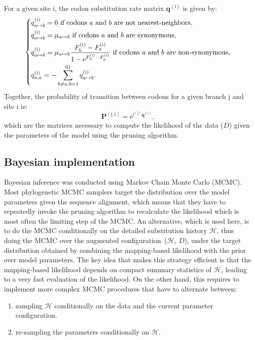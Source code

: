 \documentclass{article}
\newcommand{\BiDimArray}[1]{\bm{#1}}
\newcommand{\e}{\text{e}}
\newcommand{\submatrix}{q}
\newcommand{\Submatrix}{\BiDimArray{\submatrix}}
\newcommand{\probmatrix}{P}
\newcommand{\Probmatrix}{\BiDimArray{\probmatrix}}
\newcommand{\fit}{F}
\newcommand{\ci}{{a}}
\newcommand{\cj}{{b}}
\newcommand{\itoj}{\ci \mapsto \cj}
\newcommand{\fiti}{\fit_{\ci}}
\newcommand{\fitj}{\fit_{\cj}}
\newcommand{\branch}{\text{j}}
\newcommand{\branchexp}{^{(\branch)}}
\newcommand{\branchlength}{l}
\newcommand{\data}{D}
\newcommand{\site}{\text{i}}
\newcommand{\siteexp}{^{(\site)}}
\newcommand{\branchsiteexp}{^{(\branch, \site)}}
\newcommand{\subhistory}{\mathcal{H}}
\begin{document}
    For a given site $\site$, the {codon} {substitution} rate matrix $\Submatrix\siteexp$ is given by:
    \begin{equation}
        \label{eq:subrates}
        \begin{dcases}
            \submatrix\siteexp_{\itoj} = 0\text{ if codons $\ci$ and $\cj$ are not nearest-neighbors,} \\
            \submatrix\siteexp_{\itoj} = \mu_{\itoj}\text{ if codons $\ci$ and $\cj$ are {synonymous},} \\
            \submatrix\siteexp_{\itoj} = \mu_{\itoj} \dfrac{ \fitj\siteexp - \fiti\siteexp}{{1 - \e^{\fiti\siteexp - \fitj\siteexp} }} \text{ if codons $\ci$ and $\cj$ are non-synonymous,}\\
            \submatrix\siteexp_{\ci, \ci} = - \sum\limits_{ \cj \neq \ci, \cj=1}^{61} \submatrix\siteexp_{\itoj}.
        \end{dcases}
    \end{equation}
    Together, the probability of transition between codons for a given branch $\branch$ and site $\site$ is:
    \begin{equation}
        \label{eq:Probmatrix}
        \Probmatrix\branchsiteexp = \e^{\branchlength\branchexp \Submatrix\siteexp},
    \end{equation}
    which are the matrices necessary to compute the {likelihood} of the data ($\data$) given the parameters of the model using the pruning algorithm.

    \subsection{Bayesian implementation}
    \label{sec:Bayesian}
    Bayesian inference was conducted using Markov Chain Monte Carlo (MCMC).
    Most phylogenetic {MCMC} samplers target the distribution over the model parameters given the sequence alignment, which means that they have to repeatedly invoke the pruning algorithm to recalculate the {likelihood} which is most often the limiting step of the {MCMC}.
    An alternative, which is used here, is to do the {MCMC} conditionally on the detailed {substitution} history $\subhistory$, thus doing the {MCMC} over the augmented configuration~($\subhistory$, $\data$), under the target distribution obtained by combining the mapping-based {likelihood} with the {prior} over model parameters.
    The key idea that makes this strategy efficient is that the mapping-based {likelihood} depends on compact summary statistics of $\subhistory$, leading to a very fast evaluation of the {likelihood}.
    On the other hand, this requires to implement more complex {MCMC} procedures that have to alternate between:
    \begin{enumerate}
        \item sampling $\subhistory$ conditionally on the data and the current parameter configuration.
        \item re-sampling the parameters conditionally on $\subhistory$.
    \end{enumerate}
\end{document}
